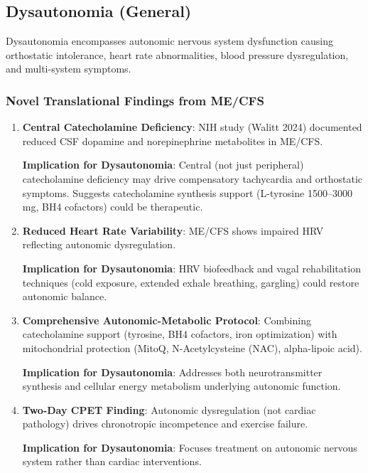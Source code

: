\subsection{Dysautonomia (General)}
\label{sec:dysautonomia-general}

Dysautonomia encompasses autonomic nervous system dysfunction causing orthostatic intolerance, heart rate abnormalities, blood pressure dysregulation, and multi-system symptoms.

\subsubsection{Novel Translational Findings from ME/CFS}

\begin{enumerate}
    \item \textbf{Central Catecholamine Deficiency}: NIH study (Walitt 2024) documented reduced CSF dopamine and norepinephrine metabolites in ME/CFS.

    \textbf{Implication for Dysautonomia}: Central (not just peripheral) catecholamine deficiency may drive compensatory tachycardia and orthostatic symptoms. Suggests catecholamine synthesis support (L-tyrosine 1500--3000 mg, BH4 cofactors) could be therapeutic.

    \item \textbf{Reduced Heart Rate Variability}: ME/CFS shows impaired HRV reflecting autonomic dysregulation.

    \textbf{Implication for Dysautonomia}: HRV biofeedback and vagal rehabilitation techniques (cold exposure, extended exhale breathing, gargling) could restore autonomic balance.

    \item \textbf{Comprehensive Autonomic-Metabolic Protocol}: Combining catecholamine support (tyrosine, BH4 cofactors, iron optimization) with mitochondrial protection (MitoQ, N-Acetylcysteine (NAC), alpha-lipoic acid).

    \textbf{Implication for Dysautonomia}: Addresses both neurotransmitter synthesis and cellular energy metabolism underlying autonomic function.

    \item \textbf{Two-Day CPET Finding}: Autonomic dysregulation (not cardiac pathology) drives chronotropic incompetence and exercise failure.

    \textbf{Implication for Dysautonomia}: Focuses treatment on autonomic nervous system rather than cardiac interventions.
\end{enumerate}

